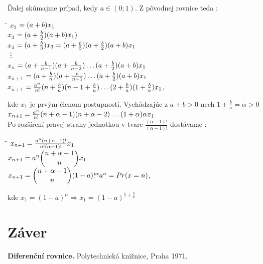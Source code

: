 \documentclass[a4paper,10pt]{article}
\theoremstyle{plain}
\theoremstyle{definition}
\begin{document}
Ďalej skúmajme prípad, kedy $ a \in (0;1) $. Z pôvodnej rovnice teda :
\begin{spacing}{1.6}
\begin{tabbing}
\hspace{0.7cm}\=\kill 
$ x_{2}$ \> $=(a+b)\*x_{1} $\\
$ x_{3}$ \> $=(a + \frac{b}{2}) \* (a + b)\*x_{1} ) $\\
$ x_{4}$ \> $=(a + \frac{b}{3})\*x_{3}= (a + \frac{b}{3})\*(a + \frac{b}{2})\*(a + b)\*x_{1} $\\
\vdots \\
$ x_{n}$ \> $=(a + \frac{b}{n-1})\*(a + \frac{b}{n-2}) \ldots (a + \frac{b}{2})\*(a + b)\*x_{1}$\\
$ x_{n+1}$ \> $=(a + \frac{b}{n})\*(a + \frac{b}{n-1}) \ldots (a + \frac{b}{2})\*(a + b)\*x_{1}$\\
$ x_{n+1}$ \> $=\frac{a^{n}}{n!}\*(n + \frac{b}{a})\*(n-1 + \frac{b}{a}) \ldots (2 + \frac{b}{a})\*(1 + \frac{b}{a})\*x_{1}$,\\
\end{tabbing} 
\end{spacing}
kde $ x_{1} $ je prvým členom postupnosti. Vychádzajúc z $ a + b > 0 $ nech $ 1 + \frac{b}{a} = \alpha > 0$\\
$ x_{n+1} = \frac{a^{n}}{n!}\*(n+\alpha-1)\*(n+\alpha-2) \ldots (1+\alpha)\*\alpha\*x_{1}$\\\newpage
Po rozšírení pravej strany jednotkou v tvare $ \frac{(\alpha-1)!}{(\alpha-1)!} $ dostávame : \\
\begin{spacing}{2.2}
\begin{tabbing}
\hspace{0.7cm}\=\kill 
$ x_{n+1} = \frac{a^{n}\*(n+\alpha-1)!}{n!\*(\alpha-1)!}\*x_{1} $\\
$ x_{n+1} = a^{n}\* \dbinom{n+\alpha-1}{n}\*x_{1} $\\	%
$ x_{n+1} = \dbinom{n+\alpha-1}{n}\*(1-a)!^{\alpha}\*a^{n} = Pr(x = n) $,
\end{tabbing} 
\end{spacing}
kde $ x_{1} = (1-a)^{\alpha} \Rightarrow x_{1} = (1-a)^{1+\frac{b}{a}}$ 
\newpage
\section{Záver}


\begin{thebibliography}{9}
               {\bf Diferenční rovnice.}
           Polytechnická knižnice, Praha 1971.
\end{thebibliography}
\end{document}
